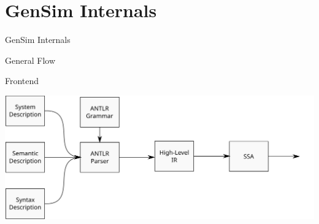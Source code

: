 \section{GenSim Internals}

\begin{frame}{GenSim Internals}
\end{frame}

\begin{frame}{General Flow}

\centering
{}
\end{frame}

\begin{frame}{Frontend}

\includegraphics[width=\textwidth]{figures/gensim-frontend}

\end{frame}

